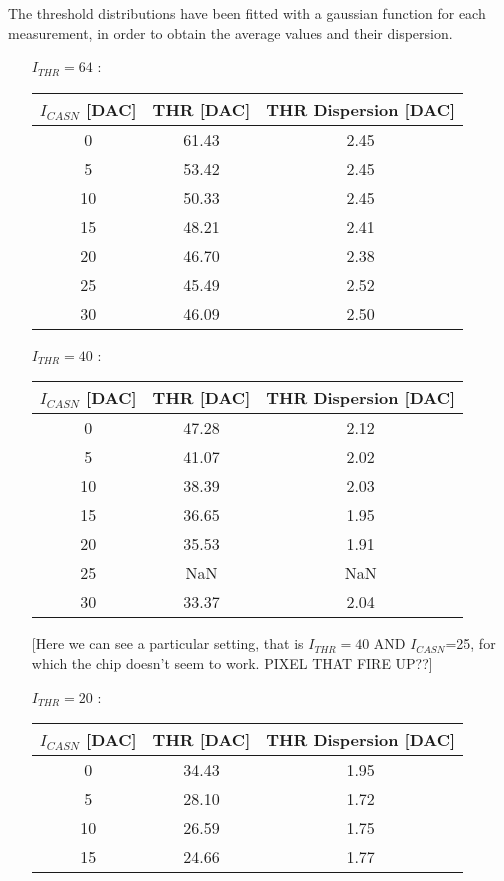 The threshold distributions have been fitted with a gaussian function for each measurement,  in order to obtain the average values and their dispersion.

\begin{itemize}
\item[$I_{THR}=64$]:

\begin{tabular}{c | c | c}
$I_{CASN}$ [DAC] & THR [DAC] & THR Dispersion [DAC]\\
\hline
0 & 61.43 & 2.45\\
5 & 53.42 & 2.45\\
10 & 50.33 & 2.45\\
15 & 48.21 & 2.41\\
20 & 46.70 & 2.38\\
25 & 45.49 & 2.52\\
30 & 46.09 & 2.50
\end{tabular}

\item[$I_{THR}=40$]:

\begin{tabular}{c | c | c}
$I_{CASN}$ [DAC] & THR [DAC] & THR Dispersion [DAC]\\
\hline
0 & 47.28 & 2.12\\
5 & 41.07 & 2.02\\
10 & 38.39 & 2.03\\
15 & 36.65 & 1.95\\
20 & 35.53 & 1.91\\
25 & NaN & NaN\\
30 & 33.37 & 2.04
\end{tabular}

[Here we can see a particular setting, that is $I_{THR}=40$ AND $I_{CASN}$=25, for which the chip doesn't seem to work.
PIXEL THAT FIRE UP??]

\item[$I_{THR}=20$]:

\begin{tabular}{c | c | c}
$I_{CASN}$ [DAC] & THR [DAC] & THR Dispersion [DAC]\\
\hline
0 & 34.43 & 1.95\\
5 & 28.10& 1.72\\
10 & 26.59 & 1.75\\
15 & 24.66 & 1.77\\
\end{tabular}
\medskip\\

\end{itemize}

